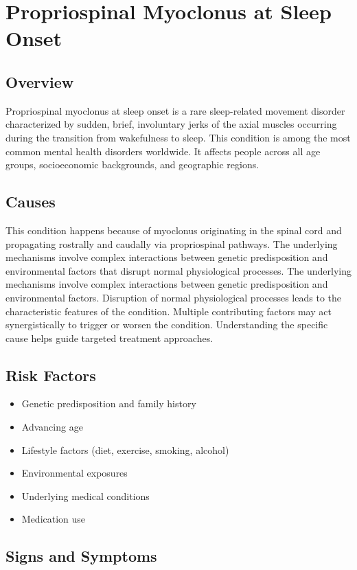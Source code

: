 \chapter{Propriospinal Myoclonus at Sleep Onset}
\label{sec:Propriospinal Myoclonus at Sleep Onset}

\section{Overview}
Propriospinal myoclonus at sleep onset is a rare sleep-related movement disorder characterized by sudden, brief, involuntary jerks of the axial muscles occurring during the transition from wakefulness to sleep. This condition is among the most common mental health disorders worldwide. It affects people across all age groups, socioeconomic backgrounds, and geographic regions.
\section{Causes}
This condition happens because of myoclonus originating in the spinal cord and propagating rostrally and caudally via propriospinal pathways. The underlying mechanisms involve complex interactions between genetic predisposition and environmental factors that disrupt normal physiological processes. The underlying mechanisms involve complex interactions between genetic predisposition and environmental factors. Disruption of normal physiological processes leads to the characteristic features of the condition. Multiple contributing factors may act synergistically to trigger or worsen the condition. Understanding the specific cause helps guide targeted treatment approaches.
\section{Risk Factors}


\begin{itemize}[noitemsep]
  \item Genetic predisposition and family history
  \item Advancing age
  \item Lifestyle factors (diet, exercise, smoking, alcohol)
  \item Environmental exposures
  \item Underlying medical conditions
  \item Medication use
\end{itemize}
\section{Signs and Symptoms}

